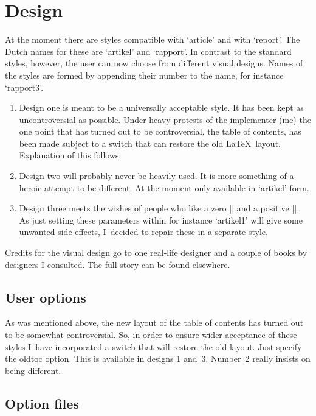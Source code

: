 \documentclass[a4paper,10pt]{artikel1} %
\newcommand\Lopt[1]{\textsf{#1}}
\begin{document}
\MakeShortVerb{\|}

\section{Design}

At the moment there are styles compatible with `article' and with
`report'. The Dutch names for these are `artikel' and `rapport'. In
contrast to the standard styles, however, the user can now choose from
different visual designs.  Names of the styles are formed by appending
their number to the name, for instance `rapport3'.
\begin{enumerate}
\item Design one is meant to be a universally acceptable style.  It
  has been kept as uncontroversial as possible.  Under heavy protests
  of the implementer (me) the one point that has turned out to be
  controversial, the table of contents, has been made subject to a
  switch that can restore the old \LaTeX\ layout. Explanation of this
  follows.
\item Design two will probably never be heavily used. It is more
  something of a heroic attempt to be different. At the moment only
  available in `artikel' form.
\item Design three meets the wishes of people who like a zero
  |\parindent| and a positive |\parskip|.  As just setting these
  parameters within for instance `artikel1' will give some unwanted
  side effects, I~decided to repair these in a separate style.
\end{enumerate}
Credits for the visual design go to one real-life designer and a
couple of books by designers I consulted.  The full story can be found
elsewhere.

\subsection{User options}

As was mentioned above, the new layout of the table of contents has
turned out to be somewhat controversial.  So, in order to ensure wider
acceptance of these styles I~have incorporated a switch that will
restore the old layout. Just specify the \Lopt{oldtoc} option.  This is
available in designs 1 and~3. Number~2 really insists on being
different.


\subsection{Option files}
\end{document}
